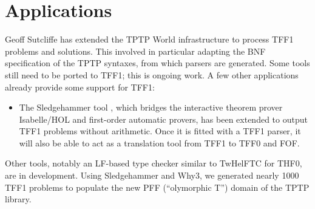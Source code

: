 \section{Applications}
\label{sec_apps}

Geoff Sutcliffe has extended the TPTP World infrastructure to process TFF1
problems and solutions. This involved in particular adapting the BNF
specification of the TPTP syntaxes, from which parsers are generated. Some tools
still need to be ported to TFF1; this is ongoing work.
%
A few other applications already provide some support for TFF1:
%
\begin{itemize}

\item The Sledgehammer tool \cite{paulson-blanchette-2010}, which bridges the
interactive theorem prover Isabelle\slash HOL and first-order automatic provers,
has been extended to output TFF1 problems without arithmetic. Once it is fitted
with a TFF1 parser, it will also be able to act as a translation tool from TFF1
to TFF0 and FOF.

\end{itemize}

Other tools, notably an LF-based type checker similar to TwHelFTC for THF0,
are in development.
%
Using Sledgehammer and Why3, we generated nearly 1000 TFF1 problems to populate
the new PFF (``olymorphic T'') domain of the TPTP library.

%
%
%
%

